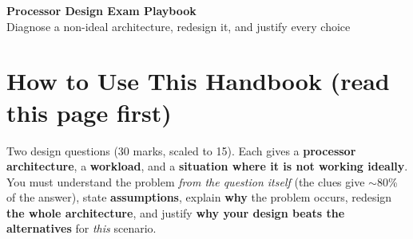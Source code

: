 \begin{center}
{\LARGE\bfseries Processor Design Exam Playbook}\\[1pt]
{\normalsize Diagnose a non-ideal architecture, redesign it, and justify every choice}
\end{center}
\vspace{-2pt}
\section{How to Use This Handbook (read this page first)}\label{sec:howto}

\begin{prof}
Two design questions (30 marks, scaled to 15). Each gives a \textbf{processor architecture}, a \textbf{workload}, and a \textbf{situation where it is not working ideally}. You must understand the problem \emph{from the question itself} (the clues give $\sim$80\% of the answer), state \textbf{assumptions}, explain \textbf{why} the problem occurs, redesign \textbf{the whole architecture}, and justify \textbf{why your design beats the alternatives} for \emph{this} scenario.
\end{prof}

